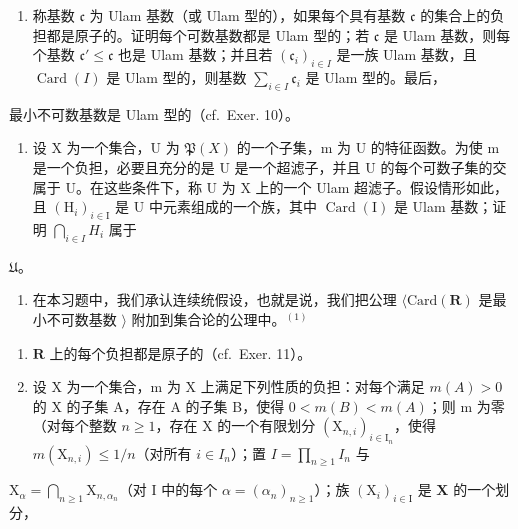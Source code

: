 \begin{enumerate}
\def\labelenumi{\arabic{enumi})}
\setcounter{enumi}{10}
\tightlist
\item
  称基数 \(\mathfrak{c}\) 为 Ulam 基数（或 Ulam 型的），如果每个具有基数 \(\mathfrak{c}\) 的集合上的负担都是原子的。证明每个可数基数都是 Ulam 型的；若 \(\mathfrak{c}\) 是 Ulam 基数，则每个基数 \(\mathfrak{c}' \leqslant \mathfrak{c}\) 也是 Ulam 基数；并且若 \((\mathfrak{c}_i)_{i \in I}\) 是一族 Ulam 基数，且 \(\operatorname{Card}(I)\) 是 Ulam 型的，则基数 \(\sum_{i \in I} \mathfrak{c}_i\) 是 Ulam 型的。最后，
\end{enumerate}

最小不可数基数是 Ulam 型的（cf.~Exer. 10）。

\begin{enumerate}
\def\labelenumi{\arabic{enumi})}
\setcounter{enumi}{11}
\tightlist
\item
  设 X 为一个集合，U 为 \(\mathfrak{P}(X)\) 的一个子集，m 为 U 的特征函数。为使 m 是一个负担，必要且充分的是 U 是一个超滤子，并且 U 的每个可数子集的交属于 U。在这些条件下，称 U 为 X 上的一个 Ulam 超滤子。假设情形如此，且 \((\mathrm{H}_{i})_{i\in\mathrm{I}}\) 是 U 中元素组成的一个族，其中 \(\operatorname{Card}(\mathrm{I})\) 是 Ulam 基数；证明 \(\bigcap_{i\in I} H_{i}\) 属于
\end{enumerate}

\(\mathfrak{U}\)。

\begin{enumerate}
\def\labelenumi{\arabic{enumi})}
\setcounter{enumi}{12}
\tightlist
\item
  在本习题中，我们承认连续统假设，也就是说，我们把公理 \(\langle\mathrm{Card}(\mathbf{R})\) 是最小不可数基数 \(\rangle\) 附加到集合论的公理中。\(^{(1)}\)
\end{enumerate}

\begin{enumerate}
\def\labelenumi{\alph{enumi})}
\item
  \(\mathbf{R}\) 上的每个负担都是原子的（cf.~Exer. 11）。
\item
  设 X 为一个集合，m 为 X 上满足下列性质的负担：对每个满足 \(m(A) > 0\) 的 X 的子集 A，存在 A 的子集 B，使得 \(0 < m(B) < m(A)\)；则 m 为零（对每个整数 \(n \geqslant 1\)，存在 X 的一个有限划分 \((\mathrm{X}_{n,i})_{i \in \mathrm{I}_n}\)，使得 \(m(\mathrm{X}_{n,i}) \leqslant 1/n\)（对所有 \(i \in I_n\)）；置 \(I = \prod_{n \geqslant 1} I_n\) 与
\end{enumerate}

\(\mathrm{X}_{\alpha} = \bigcap_{n\geqslant 1}\mathrm{X}_{n,\alpha_n}\)（对 I 中的每个 \(\alpha = (\alpha_{n})_{n\geqslant 1}\)）；族 \((\mathrm{X}_i)_{i\in \mathrm{I}}\) 是 \(\mathbf{X}\) 的一个划分，

